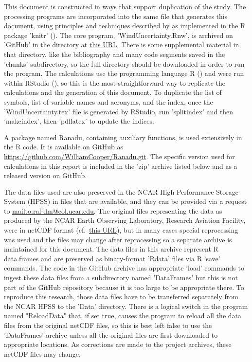 \documentclass[12pt,twoside,english]{article}\usepackage[]{graphicx}\usepackage[]{color}
\let\OrgIndex\index
\renewcommand*{\index}[1]{\OrgIndex{#1}}
\begin{document}
This document is constructed in ways that support duplication of the
study. The processing programs are incorporated into the same file
that generates this document, using principles and techniques described
by \citet{Xie2014a} as implemented in the R package 'knitr' (\citet{Xie2014b}).
The core program, 'WindUncertainty.Rnw', is archived on 'GitHub' 
in
the directory at \href{https://github.com/WilliamCooper/WindUncertainty.git}{this URL}.
There is some supplemental material in that directory, like the bibliography
and many code segments saved in the 'chunks' subdirectory, so the
full directory should be downloaded in order to run the program. The calculations
use the programming language R (\citet{Rlanguage}) and were run within RStudio
(\citet{RStudio2012}), so this is the most straightforward way to replicate the
calculations and the generation of this document. To duplicate the list of symbols, list of variable names and acronyms, and the index, once the 'WindUncertainty.tex' file is generated by RStudio, run 'splitindex' and then 'makeindex', then 'pdflatex' to update the indices.

A package named Ranadu, containing auxiliary functions, is used extensively
in the R code. It is
available on GitHub as \href{https://github.com/WilliamCooper/Ranadu.git}{https://github.com/WilliamCooper/Ranadu.git}. The specific version used for calculations in this
report is included in the 'zip' archive listed below and as a released version on GitHub.

The data files used are also preserved in the NCAR High Performance
Storage System (HPSS) in files that are available, and they can be
provided via a request to \url{mailto:raf-dm@eol.ucar.edu}.
The original files representing the data as produced by the NCAR Earth
Observing Laboratory, Research Aviation Facility, were in netCDF format
(cf.~\href{http://www.unidata.ucar.edu/software/netcdf/}{this URL}),
but in many cases special reprocessing was used and the files may
change after reprocessing so a separate archive is maintained for
this document. The data files in this archive represent R data.frames
and are preserved as binary-format 'Rdata' files via R 'save' commands.
The code in the GitHub archive has appropriate 'load' commands to
ingest these data files from a subdirectory named 'DataFrames' but this
is not part of the GitHub repository because it is too large to be
appropriate there. To reproduce this research, those data files have
to be transferred separately from the NCAR HPSS to the 'Data' directory. 
There is a logical switch in the program named "ReloadData" that, if set true,
causes the program to reload all the data files from the original netCDF
files, so this is best left false to use the 'DataFrames' archive unless
all the original files are first downloaded to appropriate locations. As
corrections are made to the project archives, these netCDF files may change.
\end{document}
